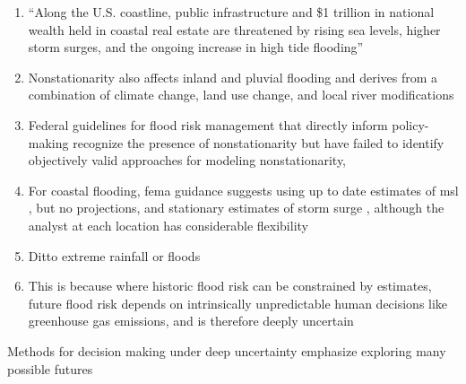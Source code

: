 \documentclass[12pt]{article}
\begin{document}
\begin{enumerate}
    \item ``Along the U.S. coastline, public infrastructure and \$1 trillion in national wealth held in coastal real estate are threatened by rising sea levels, higher storm surges, and the ongoing increase in high tide flooding'' \citep{reidmiller_reportinbrief:2018}
    \item Nonstationarity also affects inland and pluvial flooding \citep{Milly:2008dg} and derives from a combination of climate change, land use change, and local river modifications \citep{Merz:2014gf}
    \item Federal guidelines for flood risk management that directly inform policy-making recognize the presence of nonstationarity but have failed to identify objectively valid approaches for modeling nonstationarity, \citep{Montanari:2014hl,Serinaldi:2015bq}
    \item For coastal flooding, \gls{fema} guidance suggests using up to date estimates of \gls{msl} \citep{fema_slr:2016}, but no projections, and stationary estimates of storm surge \citep{fema_ffa:2016}, although the analyst at each location has considerable flexibility
    \item Ditto extreme rainfall \citep{atlas14_texas:2018} or floods \citep{bulletin17c:2019}
    \item This is because where historic flood risk can be constrained by estimates, future flood risk depends on intrinsically unpredictable human decisions like greenhouse gas emissions, and is therefore deeply uncertain \citep{keller_management:2021}
\end{enumerate}
Methods for decision making under deep uncertainty emphasize exploring many possible futures
\end{document}

